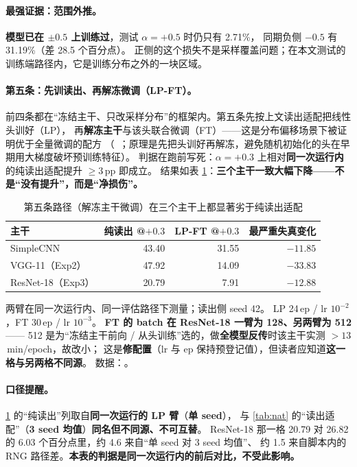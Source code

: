 \documentclass[11pt,a4paper]{ctexart}
\begin{document}
\paragraph{最强证据：范围外推。}
\textbf{模型已在 $\pm0.5$ 上训练过}，测试 $\alpha=+0.5$ 时仍只有 2.71\%，
同期负侧 $-0.5$ 有 31.19\%（差 28.5 个百分点）。
正侧的这个损失不是采样覆盖问题；在本文测试的训练端路径内，它是训练分布之外的一块区域。

\paragraph{第五条：先训读出、再解冻微调（LP-FT）。}
前四条都在“冻结主干、只改采样分布”的框架内。第五条先按上文读出适配把线性头训好（LP），
再\textbf{解冻主干}与该头联合微调（FT）——这是分布偏移场景下被证明优于全量微调的配方
（~\cite{lpft}；原理是先把头训好再解冻，避免随机初始化的头在早期用大梯度破坏预训练特征）。
判据在跑前写死：$\alpha=+0.3$ 上相对\textbf{同一次运行内}的纯读出适配提升 $\ge3$\,pp 即成立。
结果如表 \ref{tab:lpft}：\textbf{三个主干一致大幅下降——不是“没有提升”，而是“净损伤”。}

\begin{table}[t]
\centering
\caption{第五条路径（解冻主干微调）在三个主干上都显著劣于纯读出适配}
\label{tab:lpft}
\small
\begin{tabular}{lrrr}
\toprule
主干 & 纯读出 @$+0.3$ & LP-FT @$+0.3$ & 最严重失真变化 \\
\midrule
SimpleCNN        & 43.40 & 31.55 & \textbf{$-11.85$} \\
VGG-11（Exp2）   & 47.92 & 14.09 & \textbf{$-33.83$} \\
ResNet-18（Exp3）& 20.79 &  7.91 & \textbf{$-12.88$} \\
\bottomrule
\end{tabular}

\vspace{2pt}
\begin{minipage}{0.94\textwidth}
\footnotesize
两臂在同一次运行内、同一评估路径下测量；读出侧 seed 42。
LP 24\,ep / lr $10^{-2}$，FT 30\,ep / lr $10^{-3}$。
\textbf{FT 的 batch 在 ResNet-18 一臂为 128、另两臂为 512}——
512 是为“冻结主干前向 / 从头训练”选的，做\textbf{全模型反传}时该主干实测 $>13$\,min/epoch，故改小；
这是\textbf{修配置}（lr 与 ep 保持预登记值），但读者应知道\textbf{这一格与另两格不同源}。
数据：。
\end{minipage}
\end{table}

\paragraph{口径提醒。}
\cref{tab:lpft} 的“纯读出”列取自\textbf{同一次运行的 LP 臂}（\textbf{单 seed}），
与 \cref{tab:nat} 的“读出适配”（\textbf{3 seed 均值}）\textbf{同名但不同源、不可互替}。
ResNet-18 那一格 20.79 对 26.82 的 6.03 个百分点里，约 4.6 来自“单 seed 对 3 seed 均值”、
约 1.5 来自脚本内的 RNG 路径差。\textbf{本表的判据是同一次运行内的前后对比，不受此影响。}
\end{document}
